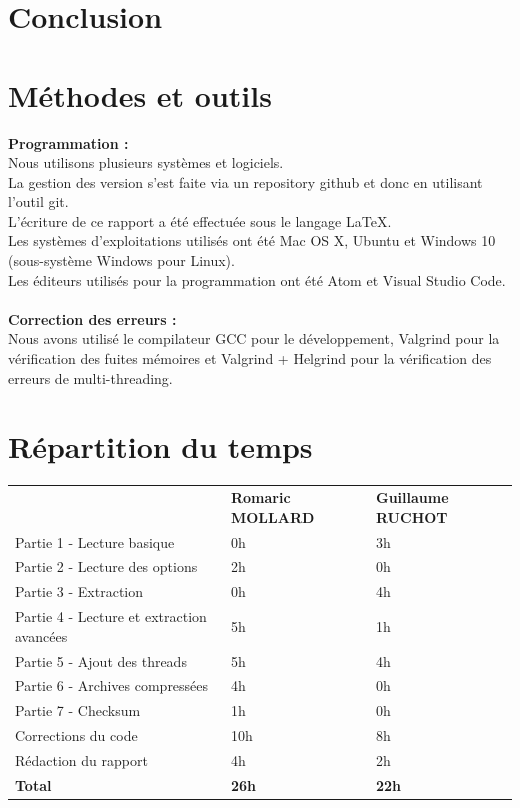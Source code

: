 \documentclass{scrreprt}
\begin{document}
\section{Conclusion}


\section{Méthodes et outils}
\textbf{Programmation :}\\
Nous utilisons plusieurs systèmes et logiciels.\\
La gestion des version s'est faite via un repository github et donc en utilisant l'outil git.\\
L'écriture de ce rapport a été effectuée sous le langage LaTeX.\\
Les systèmes d'exploitations utilisés ont été Mac OS X, Ubuntu et Windows 10 (sous-système Windows pour Linux).\\
Les éditeurs utilisés pour la programmation ont été Atom et Visual Studio Code.\\\\
\textbf{Correction des erreurs :}\\
Nous avons utilisé le compilateur GCC pour le développement, Valgrind pour la vérification des fuites mémoires et Valgrind + Helgrind pour la vérification des erreurs de multi-threading.

\section{Répartition du temps}

\begin{tabular}{lll}
                                          & \textbf{Romaric MOLLARD} & \textbf{Guillaume RUCHOT} \\
Partie 1 - Lecture basique                & 0h              & 3h            \\
Partie 2 - Lecture des options            & 2h              & 0h            \\
Partie 3 - Extraction                     & 0h              & 4h            \\
Partie 4 - Lecture et extraction avancées & 5h              & 1h            \\
Partie 5 - Ajout des threads              & 5h              & 4h           \\
Partie 6 - Archives compressées           & 4h              & 0h            \\
Partie 7 - Checksum                       & 1h              & 0h            \\
Corrections du code                       & 10h             & 8h           \\
Rédaction du rapport                      & 4h              & 2h           \\
\textbf{Total}                            & \textbf{26h}             & \textbf{22h}
\end{tabular}
\end{document}
